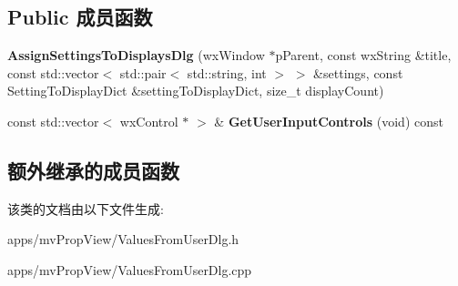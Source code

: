 \subsection*{Public 成员函数}
\begin{DoxyCompactItemize}
\item 
\hypertarget{class_assign_settings_to_displays_dlg_aa5426c394415ccac71dfa62aea2ed62f}{{\bfseries Assign\+Settings\+To\+Displays\+Dlg} (wx\+Window $\ast$p\+Parent, const wx\+String \&title, const std\+::vector$<$ std\+::pair$<$ std\+::string, int $>$ $>$ \&settings, const Setting\+To\+Display\+Dict \&setting\+To\+Display\+Dict, size\+\_\+t display\+Count)}\label{class_assign_settings_to_displays_dlg_aa5426c394415ccac71dfa62aea2ed62f}

\item 
\hypertarget{class_assign_settings_to_displays_dlg_a575c2764061771092b5079a57e00fbc5}{const std\+::vector$<$ wx\+Control $\ast$ $>$ \& {\bfseries Get\+User\+Input\+Controls} (void) const }\label{class_assign_settings_to_displays_dlg_a575c2764061771092b5079a57e00fbc5}

\end{DoxyCompactItemize}
\subsection*{额外继承的成员函数}


该类的文档由以下文件生成\+:\begin{DoxyCompactItemize}
\item 
apps/mv\+Prop\+View/Values\+From\+User\+Dlg.\+h\item 
apps/mv\+Prop\+View/Values\+From\+User\+Dlg.\+cpp\end{DoxyCompactItemize}
